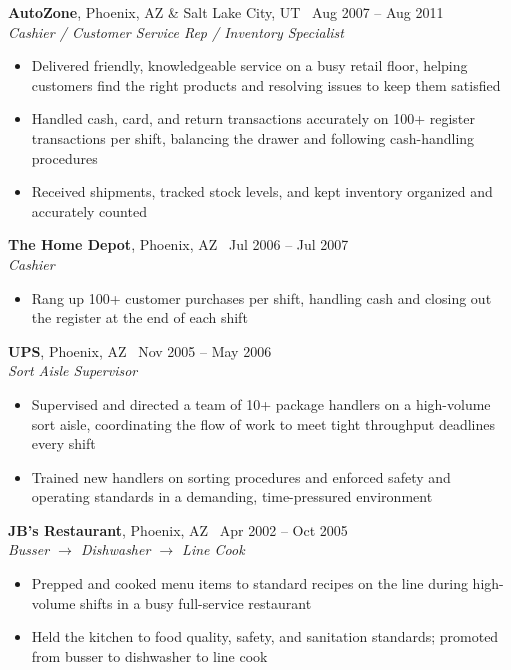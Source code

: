 \documentclass[10.5pt, letterpaper]{article}
\newcommand{\jobentry}[4]{%
  \noindent
  \textbf{\color{accent}#1}\textcolor{muted}{, #2 \textbullet\ #4}\\
  \textit{#3}%
}
\begin{document}
\jobentry{AutoZone}{Phoenix, AZ \& Salt Lake City, UT}{Cashier / Customer Service Rep / Inventory Specialist}{Aug 2007 -- Aug 2011}
\begin{itemize}
  \item Delivered friendly, knowledgeable service on a busy retail floor, helping
        customers find the right products and resolving issues to keep them satisfied
  \item Handled cash, card, and return transactions accurately on 100+ register
        transactions per shift, balancing the drawer and following cash-handling
        procedures
  \item Received shipments, tracked stock levels, and kept inventory organized and
        accurately counted
\end{itemize}

\vspace{3pt}

\jobentry{The Home Depot}{Phoenix, AZ}{Cashier}{Jul 2006 -- Jul 2007}
\begin{itemize}
  \item Rang up 100+ customer purchases per shift, handling cash and closing out the
        register at the end of each shift
\end{itemize}

\vspace{3pt}

\jobentry{UPS}{Phoenix, AZ}{Sort Aisle Supervisor}{Nov 2005 -- May 2006}
\begin{itemize}
  \item Supervised and directed a team of 10+ package handlers on a high-volume sort
        aisle, coordinating the flow of work to meet tight throughput deadlines every shift
  \item Trained new handlers on sorting procedures and enforced safety and operating
        standards in a demanding, time-pressured environment
\end{itemize}

\vspace{3pt}

\jobentry{JB's Restaurant}{Phoenix, AZ}{Busser $\rightarrow$ Dishwasher $\rightarrow$ Line Cook}{Apr 2002 -- Oct 2005}
\begin{itemize}
  \item Prepped and cooked menu items to standard recipes on the line during high-volume
        shifts in a busy full-service restaurant
  \item Held the kitchen to food quality, safety, and sanitation standards; promoted from
        busser to dishwasher to line cook
\end{itemize}
\end{document}
